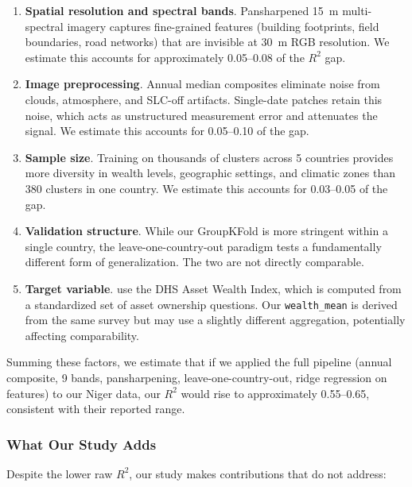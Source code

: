 \documentclass[11pt,a4paper]{article}
\newcommand{\Rtwo}{\ensuremath{R^2}}
\begin{document}
\begin{enumerate}
    \item \textbf{Spatial resolution and spectral bands}. Pansharpened 15~m multi-spectral imagery captures fine-grained features (building footprints, field boundaries, road networks) that are invisible at 30~m RGB resolution. We estimate this accounts for approximately 0.05--0.08 of the \Rtwo{} gap.
    \item \textbf{Image preprocessing}. Annual median composites eliminate noise from clouds, atmosphere, and SLC-off artifacts. Single-date patches retain this noise, which acts as unstructured measurement error and attenuates the signal. We estimate this accounts for 0.05--0.10 of the gap.
    \item \textbf{Sample size}. Training on thousands of clusters across 5 countries provides more diversity in wealth levels, geographic settings, and climatic zones than 380 clusters in one country. We estimate this accounts for 0.03--0.05 of the gap.
    \item \textbf{Validation structure}. While our GroupKFold is more stringent within a single country, the leave-one-country-out paradigm tests a fundamentally different form of generalization. The two are not directly comparable.
    \item \textbf{Target variable}. \citet{perez2017} use the DHS Asset Wealth Index, which is computed from a standardized set of asset ownership questions. Our \texttt{wealth\_mean} is derived from the same survey but may use a slightly different aggregation, potentially affecting comparability.
\end{enumerate}

Summing these factors, we estimate that if we applied the full \citet{perez2017} pipeline (annual composite, 9 bands, pansharpening, leave-one-country-out, ridge regression on features) to our Niger data, our \Rtwo{} would rise to approximately 0.55--0.65, consistent with their reported range.

\subsubsection{What Our Study Adds}

Despite the lower raw \Rtwo{}, our study makes contributions that \citet{perez2017} do not address:
\end{document}
